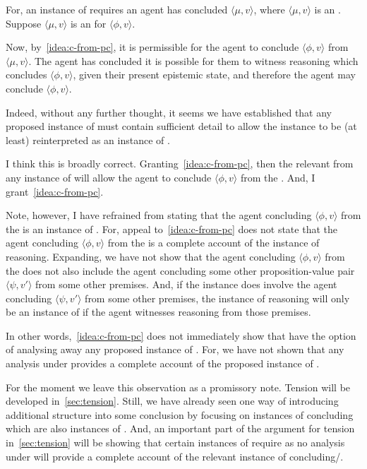 \begin{note}
  For, an instance of \adB{} requires an agent has concluded \(\langle \mu,v \rangle\), where \(\langle \mu,v \rangle\) is an .
  Suppose \(\langle \mu,v \rangle\) is an  for \(\langle \phi,v \rangle\).

  Now, by~\autoref{idea:c-from-pc}, it is permissible for the agent to conclude \(\langle \phi,v \rangle\) from \(\langle \mu,v \rangle\).
  The agent has concluded it is possible for them to witness reasoning which concludes \(\langle \phi,v \rangle\), given their present epistemic state, and therefore the agent may conclude \(\langle \phi,v \rangle\).

  Indeed, without any further thought, it seems we have established that any proposed instance of \adB{} must contain sufficient detail to allow the instance to be (at least) reinterpreted as an instance of \adA{}.

  I think this is broadly correct.
  Granting~\autoref{idea:c-from-pc}, then the relevant  from any instance of \adB{} will allow the agent to conclude \(\langle \phi,v \rangle\) from the .
  And, I grant~\autoref{idea:c-from-pc}.

  Note, however, I have refrained from stating that the agent concluding \(\langle \phi,v \rangle\) from the  is an instance of \adA{}.
  For, appeal to~\autoref{idea:c-from-pc} does not state that the agent concluding \(\langle \phi,v \rangle\) from the  is a complete account of the instance of reasoning.
  Expanding, we have not show that the agent concluding \(\langle \phi,v \rangle\) from the  does not also include the agent concluding some other proposition-value pair \(\langle \psi,v' \rangle\) from some other premises.
  And, if the instance does involve the agent concluding \(\langle \psi,v' \rangle\) from some other premises, the instance of reasoning will only be an instance of \adA{} if the agent witnesses reasoning from those premises.

  In other words,~\autoref{idea:c-from-pc} does not immediately show that have the option of analysing away any proposed instance of \adB{}.
  For, we have not shown that any analysis under \adA{} provides a complete account of the proposed instance of \adB{}.
\end{note}

\begin{note}
  For the moment we leave this observation as a promissory note.
  Tension will be developed in~\autoref{sec:tension}.
  Still, we have already seen one way of introducing additional structure into some conclusion by focusing on instances of concluding which are also instances of .
  And, an important part of the argument for tension in~\autoref{sec:tension} will be showing that certain instances of \csN{} require \adB{} as no analysis under \adA{} will provide a complete account of the relevant instance of concluding/.
\end{note}


